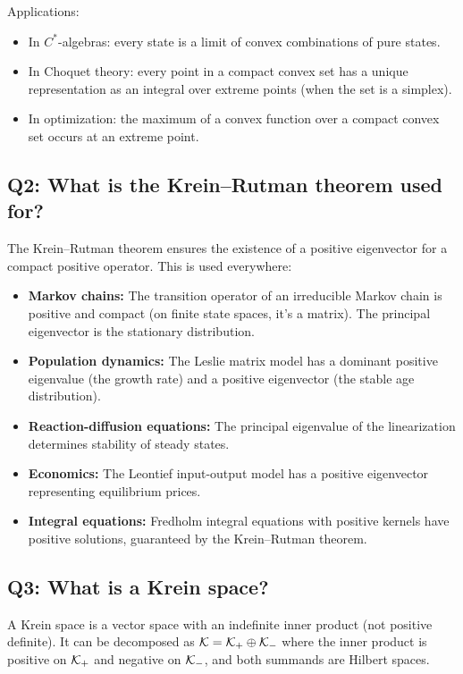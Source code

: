 Applications:
\begin{itemize}
    \item In $C^*$-algebras: every state is a limit of convex combinations of pure states.
    \item In Choquet theory: every point in a compact convex set has a unique representation as an integral over extreme points (when the set is a simplex).
    \item In optimization: the maximum of a convex function over a compact convex set occurs at an extreme point.
\end{itemize}

\subsection*{Q2: What is the Krein--Rutman theorem used for?}

The Krein--Rutman theorem ensures the existence of a positive eigenvector for a compact positive operator. This is used everywhere:
\begin{itemize}
    \item \textbf{Markov chains:} The transition operator of an irreducible Markov chain is positive and compact (on finite state spaces, it's a matrix). The principal eigenvector is the stationary distribution.
    \item \textbf{Population dynamics:} The Leslie matrix model has a dominant positive eigenvalue (the growth rate) and a positive eigenvector (the stable age distribution).
    \item \textbf{Reaction-diffusion equations:} The principal eigenvalue of the linearization determines stability of steady states.
    \item \textbf{Economics:} The Leontief input-output model has a positive eigenvector representing equilibrium prices.
    \item \textbf{Integral equations:} Fredholm integral equations with positive kernels have positive solutions, guaranteed by the Krein--Rutman theorem.
\end{itemize}

\subsection*{Q3: What is a Krein space?}

A Krein space is a vector space with an indefinite inner product (not positive definite). It can be decomposed as $\mathcal{K} = \mathcal{K}_+ \oplus \mathcal{K}_-$ where the inner product is positive on $\mathcal{K}_+$ and negative on $\mathcal{K}_-$, and both summands are Hilbert spaces.

